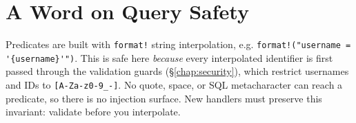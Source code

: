 \section{A Word on Query Safety}

Predicates are built with \verb|format!| string interpolation, e.g.
\verb|format!("username = '{username}'")|. This is safe here \emph{because} every
interpolated identifier is first passed through the validation guards
(\S\ref{chap:security}), which restrict usernames and IDs to
\verb|[A-Za-z0-9_-]|. No quote, space, or SQL metacharacter can reach a
predicate, so there is no injection surface. New handlers must preserve this
invariant: validate before you interpolate.
